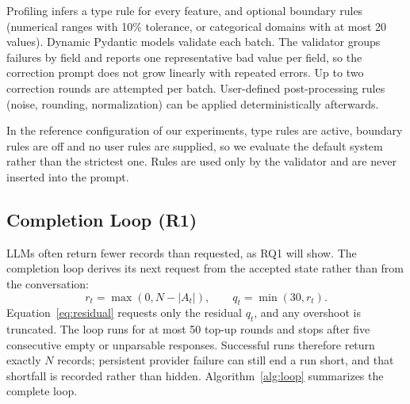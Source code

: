 \documentclass[conference]{IEEEtran}
\begin{document}
Profiling infers a type rule for every feature, and optional boundary rules (numerical ranges with 10\% tolerance, or categorical domains with at most 20 values). Dynamic Pydantic models validate each batch. The validator groups failures by field and reports one representative bad value per field, so the correction prompt does not grow linearly with repeated errors. Up to two correction rounds are attempted per batch. User-defined post-processing rules (noise, rounding, normalization) can be applied deterministically afterwards.

In the reference configuration of our experiments, type rules are active, boundary rules are off and no user rules are supplied, so we evaluate the default system rather than the strictest one. Rules are used only by the validator and are never inserted into the prompt.

\subsection{Completion Loop (R1)}
LLMs often return fewer records than requested, as RQ1 will show. The completion loop derives its next request from the accepted state rather than from the conversation:
\begin{equation}
r_t=\max(0,N-|A_t|),\qquad q_t=\min(30,r_t).
\label{eq:residual}
\end{equation}
Equation~\eqref{eq:residual} requests only the residual $q_t$, and any overshoot is truncated. The loop runs for at most 50 top-up rounds and stops after five consecutive empty or unparsable responses. Successful runs therefore return exactly $N$ records; persistent provider failure can still end a run short, and that shortfall is recorded rather than hidden. Algorithm~\ref{alg:loop} summarizes the complete loop.
\end{document}
